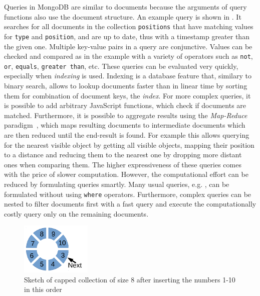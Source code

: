 Queries in MongoDB are similar to documents because the arguments of
query functions also use the document structure. An example query is shown
in . It searches for all documents in the
collection \texttt{positions} that have matching values for
\texttt{type} and \texttt{position}, and are up to date, thus with a
timestamp greater than the given one. Multiple key-value pairs in a
query are conjunctive.  Values can be checked and compared as in the
example with a variety of operators such as \texttt{not}, \texttt{or},
\texttt{equals}, \texttt{greater than}, etc. These queries can be
evaluated very quickly, especially when \emph{indexing} is
used. Indexing is a
database feature that, similary to binary search, allows to lookup
documents faster than in linear time by sorting them for combination of document
keys, the \emph{index}. For more complex queries, it is possible to add arbitrary
JavaScript functions, which check if documents are matched.
Furthermore, it is possible to aggregate
results using the \emph{Map-Reduce} paradigm~\cite{mapreduce}, which
maps resulting documents to intermediate documents which are then
reduced until the end-result is found. For example this allows
querying for the nearest visible object by getting all visible
objects, mapping their position to a distance and reducing them to the
nearest one by dropping more distant ones when comparing them.
 The
higher expressiveness of these queries comes with the price of slower
computation. However, the computational effort can be reduced by
formulating queries smartly. Many usual queries,
e.g. , can be formulated without using
\texttt{where} operators. Furthermore, complex queries can be nested to
filter documents first with a fast query and execute the
computationally costly query only on the remaining documents.
\begin{figure}
  \centering
  \vspace{-5mm}
  \includegraphics[width=0.3\textwidth]{draw/capped-collection}%
  \caption[Sketch of capped collection of size 8 after inserting the numbers 1-10 in
  this order]{Sketch of capped collection of size 8 after inserting the numbers 1-10 in
  this order}
  \vspace{-3mm}
  \label{fig:capped-collection}
\end{figure}
